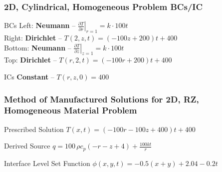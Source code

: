 \documentclass[]{beamer}
\begin{document}
\begin{frame}[t]\frametitle{2D, Cylindrical, Homogeneous Problem BCs/IC}
  \begin{block}{BCs}
    Left: \textbf{Neumann} -- $\left. \frac{\partial T}{\partial r}\right|_{r=1} = k\cdot 100t$ \\
    Right: \textbf{Dirichlet} -- $T(2,z,t) = (-100z + 200)t +400$ \\
    Bottom: \textbf{Neumann} -- $\left. \frac{\partial T}{\partial z}\right|_{z=1} = k\cdot 100t$ \\
    Top: \textbf{Dirichlet} -- $T(r,2,t) = (-100r + 200)t + 400$
  \end{block}
  
  \begin{block}{ICs}
    \textbf{Constant} -- $T(r,z,0) = 400$
  \end{block}
\end{frame}

\begin{frame}[t]\frametitle{Method of Manufactured Solutions for 2D, RZ, Homogeneous Material Problem}
  \begin{block}{Prescribed Solution}
    $T(x,t) = (-100r-100z+400)t + 400$
  \end{block}
  
  \begin{block}{Derived Source}
  $q = 100\,\rho c_p \left(-r-z+4\right)+\frac{100kt}{r}$
  \end{block}
  
  \begin{block}{Interface Level Set Function}
    $\phi(x,y,t) = -0.5(x+y) + 2.04 - 0.2t$
  \end{block}
\end{frame}
\end{document}
